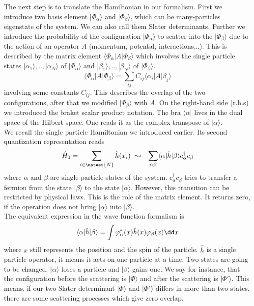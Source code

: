 \documentclass[../main.tex]{subfile}
\begin{document}
The next step is to translate the Hamiltonian in our formalism.
First we introduce two basis element $|\Phi_{\alpha}\rangle$ and $|\Phi_{\beta}\rangle$, which can be many-particles eigenstate of the system.
We can also call them Slater determinants.
Further we introduce the probability of the configuration $|\Phi_{\alpha}\rangle$ to scatter into the $|\Phi_{\beta}\rangle$ due to the action of an operator $A$ (momentum, potental, interactions,..).
This is described by the matrix element $\langle\Phi_{\alpha}|A|\Phi_{\beta}\rangle$ which involves the single particle states $|\alpha_1\rangle, .., |\alpha_N\rangle$ of $|\Phi_{\alpha}\rangle$
and $|\beta_1\rangle, ..,|\beta_N\rangle$ of $|\Phi_{\beta}\rangle$.
\[
    \langle\Phi_{\alpha}|A|\Phi_{\beta}\rangle = \sum_{ij} C_{ij}\langle\alpha_i|A|\beta_j\rangle
\]
involving some constants $C_{ij}$. This describes the overlap of the two configurations, after that we modified $|\Phi_{\beta}\rangle$ with $A$.
On the right-hand side (r.h.s) we introduced the braket scalar product notation. The bra $\langle\alpha|$ lives in the dual space
of the Hilbert space. One reads it as the complex transpose of $|\alpha\rangle$.\\

We recall the single particle Hamiltonian we introduced earlier. Its second quantization representation reads
\begin{equation}\label{eq:SecondquantizationSingleParticle}
    \hat{H}_0 = \sum_{i \in \natset{N}} \hat{h}(x_i) ~ \leadsto ~~ \sum_{\alpha\beta} \langle \alpha|\hat{h}|\beta\rangle c_{\alpha}^{\dagger}c_{\beta}
\end{equation}
where $\alpha$ and $\beta$ are single-particle states of the system. $c_{\alpha}^{\dagger}c_{\beta}$ tries to transfer a fermion
from the state $|\beta\rangle$ to the state $|\alpha\rangle$. However, this transition can be restricted by physical laws. This is the role of the matrix element.
It returns zero, if the operation does not bring $|\alpha\rangle$ into $|\beta\rangle$.\\

The equivalent expression in the wave function formalism is
\begin{equation}\label{eq:Translation_TwoStateOverlap}  
    \langle \alpha|\hat{h}|\beta\rangle = \int  \varphi_{\alpha}^{\ast}(x) \hat{h}(x) \varphi_{\beta}(x) \dd x\\
\end{equation}
where $x$ still represents the position and the spin of the particle.
$\hat{h}$ is a single particle operator, it means it acts on one particle at a time.
Two states are going to be changed. $|\alpha\rangle$ loses a particle and $|\beta\rangle$ gains one. We say for instance, that the 
configuration before the scattering is $|\Phi\rangle$ and after the scattering is $|\Phi'\rangle$. 
This means, if our two Slater determinant $|\Phi\rangle$ and $|\Phi'\rangle$ differs in more than two states, there are some scattering processes which give zero overlap.\\
\end{document}
